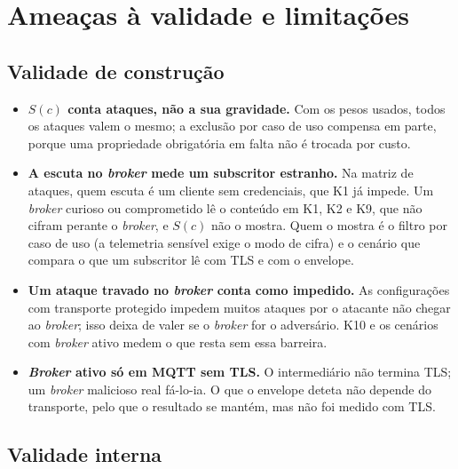 \section{Ameaças à validade e limitações}
\label{sec:ameacas}

\subsection{Validade de construção}

\begin{itemize}[leftmargin=*]
  \item \textbf{$S(c)$ conta ataques, não a sua gravidade.} Com os pesos usados,
    todos os ataques valem o mesmo; a exclusão por caso de uso compensa em parte,
    porque uma propriedade obrigatória em falta não é trocada por custo.
  \item \textbf{A escuta no \emph{broker} mede um subscritor estranho.} Na matriz
    de ataques, quem escuta é um cliente sem credenciais, que K1 já impede. Um
    \emph{broker} curioso ou comprometido lê o conteúdo em K1, K2 e K9, que não
    cifram perante o \emph{broker}, e $S(c)$ não o mostra. Quem o mostra é o
    filtro por caso de uso (a telemetria sensível exige o modo de cifra) e o
    cenário que compara o que um subscritor lê com TLS e com o envelope.
  \item \textbf{Um ataque travado no \emph{broker} conta como impedido.} As
    configurações com transporte protegido impedem muitos ataques por o atacante
    não chegar ao \emph{broker}; isso deixa de valer se o \emph{broker} for o
    adversário. K10 e os cenários com \emph{broker} ativo medem o que resta sem
    essa barreira.
  \item \textbf{\emph{Broker} ativo só em MQTT sem TLS.} O intermediário não
    termina TLS; um \emph{broker} malicioso real fá-lo-ia. O que o envelope deteta
    não depende do transporte, pelo que o resultado se mantém, mas não foi medido
    com TLS.
\end{itemize}

\subsection{Validade interna}

